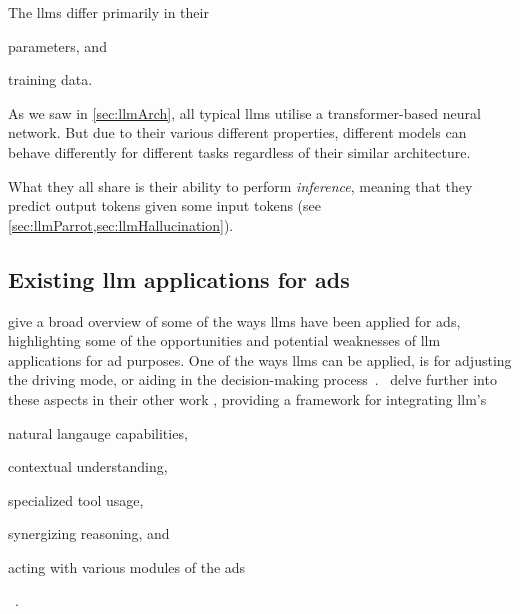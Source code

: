 The \acrshort{llms} differ primarily in their \begin{inparaenum}
    \item parameters, and
    \item training data.
\end{inparaenum}
As we saw in \cref{sec:llmArch}, all typical \acrshort{llms} utilise a transformer-based neural
network. But due to their various different properties, different models can behave differently for
different tasks regardless of their similar architecture.

What they all share is their ability to perform \textit{inference}, meaning that they predict output
tokens given some input tokens (see \cref{sec:llmParrot,sec:llmHallucination}).

\subsection{Existing \acrshort{llm} applications for \acrshort{ads}}\label{sec:llmsForAds}


\citeauthor{LLM4AD} give a broad overview of some of the ways \acrshort{llms} have been applied for
\acrshort{ads}, highlighting some of the opportunities and potential weaknesses of \acrshort{llm}
applications for \acrshort{ad} purposes. One of the ways \acrshort{llms} can be applied, is for
adjusting the driving mode, or aiding in the decision-making
process~\cite[1]{LLM4AD}.~\citeauthor{driveAsYouSpeak} delve further into these aspects in their
other work , providing a framework for integrating \acrlong{llm}'s
\begin{inparaenum}
    \item natural langauge capabilities,
    \item contextual understanding,
    \item specialized tool usage,
    \item synergizing reasoning, and
    \item acting with various modules of the \acrshort{ads}
\end{inparaenum}~\cite[1]{driveAsYouSpeak}.